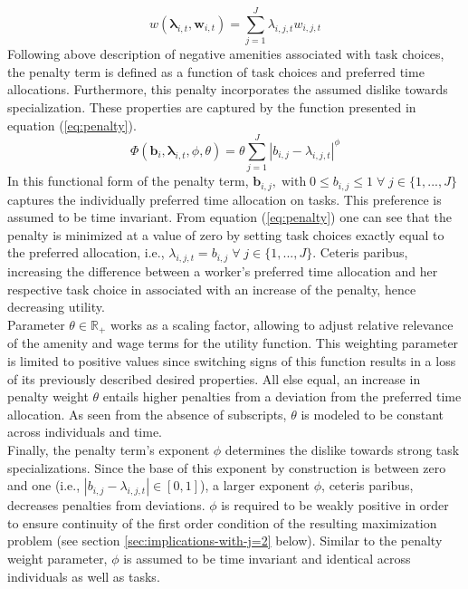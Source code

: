 \documentclass[../main.tex]{subfiles}
\begin{document}
\begin{equation}\label{eq:real_wage}
	w(\boldsymbol{\lambda}_{i,t}, \boldsymbol{w}_{i,t}) = \sum^J_{j=1} \lambda_{i,j,t} w_{i,j,t}
\end{equation}
Following above description of negative amenities associated with task choices, the penalty term is defined as a function of task choices and preferred time allocations. Furthermore, this penalty incorporates the assumed dislike towards specialization. These properties are captured by the function presented in equation (\ref{eq:penalty}).
\begin{equation}\label{eq:penalty}
	\Phi(\boldsymbol{b}_i, \boldsymbol{\lambda}_{i,t}, \phi, \theta) = \theta \sum^J_{j=1} |b_{i,j} - \lambda_{i,j,t}|^\phi
\end{equation}
In this functional form of the penalty term, $\boldsymbol{b}_{i,j}, \; \text{with} \; 0 \leq b_{i,j} \leq 1 \;  \forall \; j \in \{1, ..., J\}$ captures the individually preferred time allocation on tasks. This preference is assumed to be time invariant. From equation (\ref{eq:penalty}) one can see that the penalty is minimized at a value of zero by setting task choices exactly equal to the preferred allocation, i.e., $\lambda_{i,j,t} = b_{i,j} \; \forall \; j \in \{1, ..., J\}$. Ceteris paribus, increasing the difference between a worker's preferred time allocation and her respective task choice in associated with an increase of the penalty, hence decreasing utility.
\\
Parameter $\theta \in \mathbb{R}_+$ works as a scaling factor, allowing to adjust relative relevance of the amenity and wage terms for the utility function. This weighting parameter is limited to positive values since switching signs of this function results in a loss of its previously described desired properties. All else equal, an increase in penalty weight $\theta$ entails higher penalties from a deviation from the preferred time allocation. As seen from the absence of subscripts, $\theta$ is modeled to be constant across individuals and time. 
\\
Finally, the penalty term's exponent $\phi$ determines the dislike towards strong task specializations. Since the base of this exponent by construction is between zero and one (i.e., $|b_{i,j} - \lambda_{i,j,t}| \in [0,1]$), a larger exponent $\phi$, ceteris paribus, decreases penalties from deviations. $\phi$ is required to be weakly positive in order to ensure continuity of the first order condition of the resulting maximization problem (see section \ref{sec:implications-with-j=2} below). Similar to the penalty weight parameter, $\phi$ is assumed to be time invariant and identical across individuals as well as tasks.
\end{document}
